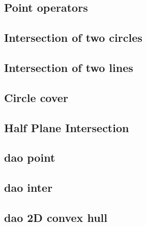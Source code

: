 \documentclass[a4paper,10pt,twocolumn,oneside]{article}
\begin{document}
\subsection{Point operators}


\subsection{Intersection of two circles}
%


\subsection{Intersection of two lines}


\subsection{Circle cover}


\subsection{Half Plane Intersection}


\subsection{dao point}


\subsection{dao inter}


\subsection{dao 2D convex hull}


%
\end{document}
